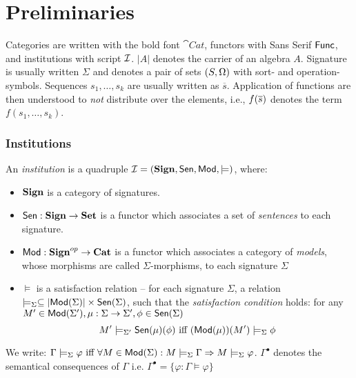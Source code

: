 \documentclass[10pt]{article}
\begin{document}
\section{Preliminaries}\label{se:pre}
Categories are written with the bold font $\cat{Cat}$,  functors with
Sans Serif ${\sf {Func}}$, and institutions with script ${\mathcal{I}}$.
$|A|$ denotes the carrier of an algebra $A$. Signature is usually written
$\Sigma$ and denotes a pair of sets
$({S},\Omega)$ with sort- and operation-symbols.
Sequences $s_1, \ldots, s_k$ are usually written
as $\overline{s}$. Application of functions are then understood to {\em not}
distribute over the elements, i.e., $f(\overline{s})$ denotes the term
$f(s_1,\ldots, s_k)$.  

\subsubsection*{Institutions}

\begin{definition}
An {\em institution} \cite{inst} is a quadruple ${\mathcal{I}} = ({\bf Sign},{\sf {Sen}},{\sf {Mod}},\models)$, where:
	\begin{itemize}\MyLPar
\item ${\bf Sign}$ is a category of signatures.  
\item ${\sf {Sen}}: {\bf Sign} \to {\bf Set}$ is a functor which associates a set of {\it sentences} to each signature.
\item ${\sf {Mod}}:{\bf Sign}^{op} \to {\bf Cat}$ is a functor which associates a
category of {\it models}, whose morphisms are called $\Sigma$-morphisms, to
each signature $\Sigma$
\item $\models$ is a satisfaction relation -- for each signature $\Sigma$, a relation
 $\models_{\Sigma} \subseteq |{\sf {Mod}}(\Sigma)| \times
{\sf {Sen}}(\Sigma)$, such that the {\it satisfaction condition} holds:
for any $M' \in {\sf {Mod}}(\Sigma'), \mu: \Sigma \to \Sigma' , \phi \in {\sf {Sen}}(\Sigma)$\vspace*{-1ex}
  \[ M' \models_{\Sigma'} {\sf {Sen}}(\mu)(\phi) \mbox{ iff } ({\sf {Mod}}(\mu))(M') \models_{\Sigma} \phi\]
	\end{itemize}
\end{definition}
%
We write: $\Gamma \models_{\Sigma}
 \varphi \mbox{ iff } \forall M \in {\sf {Mod}}(\Sigma): M \models_{\Sigma} \Gamma
 \Rightarrow M \models_{\Sigma} \varphi $.  
 $\Gamma^{\bullet}$ denotes the semantical consequences of $\Gamma$
 i.e. $\Gamma^{\bullet} = \{ \varphi: \Gamma \models \varphi \}$
 
\end{document}
